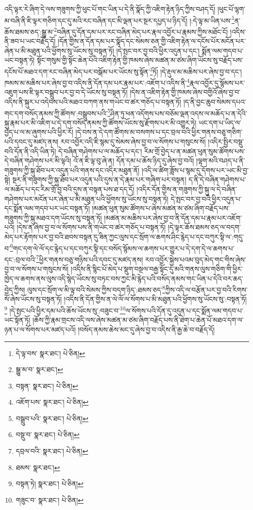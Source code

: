 འདི་ལྟར་རེ་ཞིག་དེ་ལས་གཟུགས་ཀྱི་ཕུང་པོ་གང་ཡིན་པ་དེ་ནི་སྣོད་ཀྱི་འཇིག་རྟེན་ཉིད་ཀྱིས་བཤད་དོ། །ཕུང་པོ་ལྷག་མ་བཞི་ནི་ཇི་ལྟར་གཅིག་དང་དུ་མའི་རང་བཞིན་དང་མི་ལྡན་པར་སྔར་དཔྱད་པ་ཉིད་དོ། །:དེ་ལྟ་མ་ཡིན་པས་\footnote{དེ་ལྟ་བས་  སྣར་ཐང་།  པེ་ཅིན། }ན་ཆོས་ཐམས་ཅད་:སྒྱུ་མ་\footnote{སྒྱུ་མ་བ་  སྣར་ཐང་། }བཞིན་དུ་དོན་དམ་པར་རང་བཞིན་མེད་པར་རྣལ་འབྱོར་པ་རྣམས་ཀྱིས་མཐོང་ངོ། །འདིས་ནི་ཟབ་པ་ཡང་བརྗོད་དོ། །དོན་གྱིས་ན་དོན་དམ་པར་སྣོད་དང་སེམས་ཅན་གྱི་འཇིག་རྟེན་ལ་དངོས་པོར་མངོན་པར་ཞེན་པ་མི་མཐུན་པའི་ཕྱོགས་སུ་ཡོངས་སུ་བསྟན་ཏོ། །དེ་སྤང་བར་བྱ་བའི་ཕྱིར་འདུན་པ་དང་། སྨོན་ལམ་གདབ་པ་ཡང་བསྟན་ཏེ། སྟོང་གསུམ་གྱི་སྟོང་ཆེན་པོའི་འཇིག་རྟེན་གྱི་ཁམས་ཞེས་མཚན་མ་ཙམ་ཞིག་ཡོངས་སུ་བརྗོད་པས་དངོས་པོ་མཐའ་དག་རང་བཞིན་མེད་པར་བསྒོམ་པར་ཡོངས་སུ་སྟོན་\footnote{བསྟན་  སྣར་ཐང་།  པེ་ཅིན། }ཏོ། །དེ་རྡུལ་མ་མཆིས་པར་ཞེས་བྱ་བ་དང་། ཁམས་མ་མཆིས་པར་ཞེས་བྱ་བ་འདིས་ནི་དོན་དམ་པར་རྣམ་པར་:འཇོག་པ་འདིས་ནི་\footnote{འཇོག་པས་  སྣར་ཐང་།  པེ་ཅིན། }རྣལ་འབྱོར་དུ་སྙོམས་པར་འཇུག་པས་ཇི་ལྟར་བསྒྲུབ་པར་བྱ་བ་དེ་ཡོངས་སུ་བསྟན་ཏོ། །དེས་ན་འཇིག་རྟེན་གྱི་ཁམས་ཞེས་བགྱིའོ་ཞེས་བྱ་བ་འདིས་ནི་སྐུར་པ་འདེབས་པའི་མཐའ་བཀག་ནས་གཡེང་བ་ཚར་གཅོད་པ་བསྟན་ཏོ། །ད་ནི་བྱང་ཆུབ་སེམས་དཔའ་གང་དག་བསོད་ནམས་ཀྱི་ཚོགས་:བསྒྲུབས་པའི་\footnote{བསྒྲུབ་པའི་  སྣར་ཐང་།  པེ་ཅིན། }ཤིན་ཏུ་ཕན་འདོགས་པས་བཅོམ་ལྡན་འདས་ལ་མཆོད་པ་ན་དེའི་སྐུ་རྣམ་པར་མི་འཇིག་པ་དེ་དག་བསོད་ནམས་ཀྱི་ཚོགས་ཡོངས་སུ་རྫོགས་པར་མི་འགྱུར་ཏེ། ཡང་དག་པ་ཡིད་ལ་བྱེད་པ་ལ་མ་ཞུགས་པའི་ཕྱིར་རོ། །དེ་བས་ན་དེ་དག་ཚོགས་མ་བསགས་པ་དང་བྲལ་བའི་ཕྱིར་གནས་བཅུ་གཅིག་པའི་དབང་དུ་མཛད་ནས། རབ་འབྱོར་འདི་ཇི་སྙམ་དུ་སེམས་ཞེས་བྱ་བ་ལ་སོགས་པ་གསུངས་སོ། །འདིར་སྤྱིར་བསྡུ་བའི་དོན་ནི་འདི་ཡིན་ཏེ། དེ་བཞིན་གཤེགས་པ་ལ་མཆོད་པ་དང་། རིམ་གྲོ་བྱེད་པ་ན་མཚན་ཕུན་སུམ་ཚོགས་པས་དེ་བཞིན་གཤེགས་པར་མི་ལྟའི། འོ་ན་ཇི་ལྟ་བུ་ཞེ་ན། དོན་དམ་པ་ཆོས་ཉིད་དུ་ཞེས་བྱ་བའོ། །ལྷག་མའི་བཤད་པ་ནི་གཟུགས་ཀྱི་སྐུ་ཐོབ་པར་འདུན་པའི་གནས་དང་འདིར་མཐུན་ནོ། །འདི་ལ་ཚིག་ཟློས་པ་སྙམ་དུ་དོགས་པར་ཡང་མི་བྱ་སྟེ། སྔར་ནི་གཟུགས་ཀྱི་སྐུ་ཐོབ་པར་འདུན་པའི་དུས་ན་དེ་རྣམ་པར་གཞིག་པར་བསྟན། ད་ནི་དེ་བཞིན་གཤེགས་པ་ལ་མཆོད་པ་དང་རིམ་གྲོ་བྱ་བའི་དུས་ན་བསྟན་པས་ཐ་དད་དོ། །འདིར་དོན་གྱིས་ན་གཟུགས་ཀྱི་སྐུ་ལ་དེ་བཞིན་གཤེགས་པར་མངོན་པར་ཞེན་པ་མི་མཐུན་པའི་ཕྱོགས་སུ་ཡོངས་སུ་བསྟན་ཏེ། དེ་སྤང་བར་བྱ་བའི་ཕྱིར་འདུན་པ་དང་སྨོན་ལམ་གདབ་པར་ཡང་བསྟན་ཏོ། །མཚན་ཕུན་སུམ་ཚོགས་པ་ཞེས་མཚན་མ་ཙམ་ཞིག་བརྗོད་པས་གཟུགས་ཀྱི་སྐུ་མཐའ་དག་ཡོངས་སུ་བསྟན་ཏོ། །མཚན་མ་མཆིས་པར་ཞེས་བྱ་བ་ནི་དོན་དམ་པ་རྣམ་པར་འཇོག་པའོ། །དེས་ན་ཞེས་བྱ་བ་ལ་སོགས་པས་ནི་གཡེང་བ་ཚར་གཅོད་པ་བསྟན་ཏོ། །དེ་ལྟར་ཆོས་ཐམས་ཅད་ལ་བདག་མེད་པར་རྟོགས་པར་བྱ་བའི་ཐབས་བསྟན་དུ་ཟིན་ཀྱང་ལུས་དང་སྲོག་ལ་ཆགས་ཤིང་རྙེད་པ་དང་བཀུར་སྟི་ལ་:གདུ་བ་\footnote{བསྡུ་བ་  སྣར་ཐང་།  པེ་ཅིན། }གང་དག་ལེ་ལོ་དང་རྙེད་པ་དང་བཀུར་སྟི་དང་བསོད་སྙོམས་ལ་ཆགས་པར་གྱུར་པ་དེ་དག་དེ་ལ་ཆགས་པ་དང་:བྲལ་བའི་\footnote{དབྲལ་བའི་  སྣར་ཐང་།  པེ་ཅིན། }ཕྱིར་གནས་བཅུ་གཉིས་པའི་དབང་དུ་མཛད་ནས། རབ་འབྱོར་སྐྱེས་པའམ་བུད་མེད་གང་གིས་ཞེས་བྱ་བ་ལ་སོགས་པ་གསུངས་སོ། །འདིས་ནི་སྙིང་པོ་མེད་པ་སྡུག་བསྔལ་བརྒྱ་སྟོང་དུ་མའི་གནས་ལུས་གཅིག་གི་ཕྱིར་ཁྱེད་ལ་ཆགས་ནས་ལུས་འདི་སྙེད་ཡོངས་སུ་བཏང་བས་ཀྱང་མི་རྙེད་པའི་བསོད་ནམས་གང་ཡིན་པ་དེའི་བར་ཆད་བྱེད་ཀྱིས། ལུས་དང་སྲོག་ལ་མི་ལྟ་བའི་སེམས་ཀྱིས་བདག་ཉིད་:ཐམས་ཅད་\footnote{ཐམས་  སྣར་ཐང་། }ཀྱིས་འདི་ལ་བརྩོན་པར་བྱ་བའི་རིགས་སོ་ཞེས་ཡོངས་སུ་བསྟན་ཏོ། །འདིས་ནི་དོན་གྱིས་ན་ལེ་ལོ་ལ་སོགས་པ་མི་མཐུན་པའི་ཕྱོགས་སུ་ཡོངས་སུ་:བསྟན་ཏོ།\footnote{བསྟན་ཏེ།  སྣར་ཐང་།  པེ་ཅིན། } །དེ་སྤང་པའི་ཕྱིར་དམ་པའི་ཆོས་ཡོངས་སུ་:བཟུང་བ་\footnote{གཟུང་བ་  སྣར་ཐང་།  པེ་ཅིན། }ལ་སོགས་པའི་དོན་དུ་འདུན་པ་དང་སྨོན་ལམ་གདབ་པ་ཡང་སྟོན་ཏོ། །ཆོས་ཀྱི་རྣམ་གྲངས་འདི་ལས་ཞེས་མཚན་མ་ཙམ་ཞིག་བརྗོད་པས་ནི་ཐེག་པ་ཆེན་པོ་མཐའ་དག་ལ་ཉན་པ་ལ་སོགས་པར་མཛད་པའོ། །བསོད་ནམས་ཆེས་མང་དུ་ཞེས་བྱ་བ་འདིས་ནི་རྒྱ་ཆེ་བ་བརྗོད་དོ། 